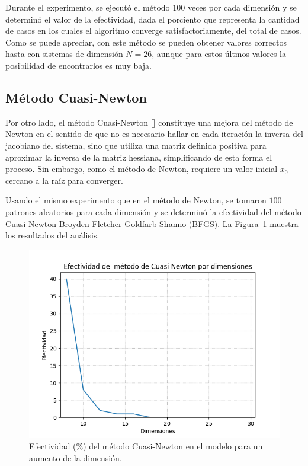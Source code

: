 \par Durante el experimento, se ejecut\'o el m\'etodo $100$ veces por cada dimensi\'on y se determin\'o el valor de la efectividad, dada el porciento que representa la cantidad de casos en los cuales el algoritmo converge satisfactoriamente, del total de casos. Como se puede apreciar, con este m\'etodo se pueden obtener valores correctos hasta con sistemas de dimensi\'on $N=26$, aunque para estos \'ultmos valores la posibilidad de encontrarlos es muy baja.

\subsection{M\'etodo Cuasi-Newton}

\par Por otro lado, el m\'etodo Cuasi-Newton [\cite{23}] constituye una mejora del m\'etodo de Newton en el sentido de que no es necesario hallar en cada iteraci\'on la inversa del jacobiano del sistema, sino que utiliza una matriz definida positiva para aproximar la inversa de la matriz hessiana, simplificando de esta forma el proceso. Sin embargo, como el m\'etodo de Newton, requiere un valor inicial $x_0$ cercano a la ra\'iz para converger.

\par Usando el mismo experimento que en el m\'etodo de Newton, se tomaron $100$ patrones aleatorios para cada dimensi\'on y se determin\'o la efectividad del m\'etodo Cuasi-Newton Broyden-Fletcher-Goldfarb-Shanno (BFGS). La Figura~\ref{Cuasi-Newton} muestra los resultados del an\'alisis.\\

\begin{figure}[h]
\center
\includegraphics[scale=.4]{Graphics/CuasiNewton.png}
\caption{Efectividad (\%) del m\'etodo Cuasi-Newton en el modelo para un aumento de la dimensi\'on.}
\label{Cuasi-Newton}
\end{figure}

